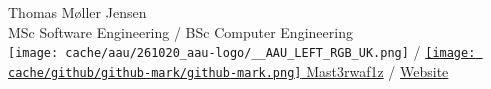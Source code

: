 Thomas Møller Jensen \\
\tiny MSc Software Engineering / BSc Computer Engineering \\
\texttt{[image: cache/aau/261020\_aau-logo/\_\_AAU\_LEFT\_RGB\_UK.png]}
\small / \href{https://github.com/Mast3rwaf1z}{\texttt{[image: cache/github/github-mark/github-mark.png]} Mast3rwaf1z}
/ \href{https://about.skademaskinen.win}{Website}